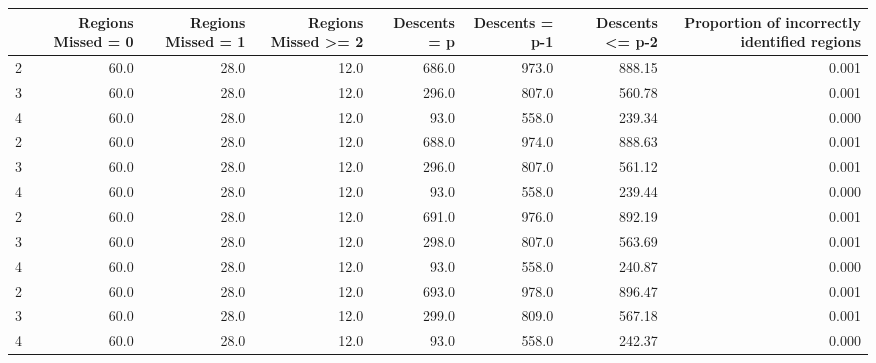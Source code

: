 \begin{tabular}{lrrrrrrr}
\toprule
{} &  Regions Missed = 0 &  Regions Missed = 1 &  Regions Missed >= 2 &  Descents = p &  Descents = p-1 &  Descents <= p-2 &  Proportion of incorrectly identified regions \\
\midrule
2 &                60.0 &                28.0 &                 12.0 &         686.0 &           973.0 &           888.15 &                                         0.001 \\
3 &                60.0 &                28.0 &                 12.0 &         296.0 &           807.0 &           560.78 &                                         0.001 \\
4 &                60.0 &                28.0 &                 12.0 &          93.0 &           558.0 &           239.34 &                                         0.000 \\
2 &                60.0 &                28.0 &                 12.0 &         688.0 &           974.0 &           888.63 &                                         0.001 \\
3 &                60.0 &                28.0 &                 12.0 &         296.0 &           807.0 &           561.12 &                                         0.001 \\
4 &                60.0 &                28.0 &                 12.0 &          93.0 &           558.0 &           239.44 &                                         0.000 \\
2 &                60.0 &                28.0 &                 12.0 &         691.0 &           976.0 &           892.19 &                                         0.001 \\
3 &                60.0 &                28.0 &                 12.0 &         298.0 &           807.0 &           563.69 &                                         0.001 \\
4 &                60.0 &                28.0 &                 12.0 &          93.0 &           558.0 &           240.87 &                                         0.000 \\
2 &                60.0 &                28.0 &                 12.0 &         693.0 &           978.0 &           896.47 &                                         0.001 \\
3 &                60.0 &                28.0 &                 12.0 &         299.0 &           809.0 &           567.18 &                                         0.001 \\
4 &                60.0 &                28.0 &                 12.0 &          93.0 &           558.0 &           242.37 &                                         0.000 \\
\bottomrule
\end{tabular}
